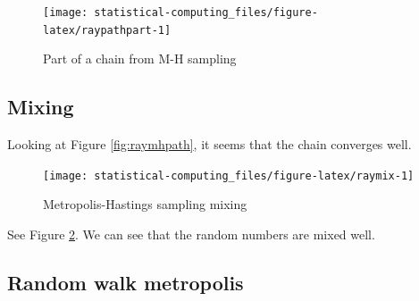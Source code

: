 \documentclass[]{book}
\newenvironment{Shaded}{\begin{snugshade}}{\end{snugshade}}
\newcommand{\DataTypeTok}[1]{\textcolor[rgb]{0.13,0.29,0.53}{#1}}
\newcommand{\KeywordTok}[1]{\textcolor[rgb]{0.13,0.29,0.53}{\textbf{#1}}}
\newcommand{\NormalTok}[1]{#1}
\newcommand{\OperatorTok}[1]{\textcolor[rgb]{0.81,0.36,0.00}{\textbf{#1}}}
\newcommand{\OtherTok}[1]{\textcolor[rgb]{0.56,0.35,0.01}{#1}}
\newcommand{\StringTok}[1]{\textcolor[rgb]{0.31,0.60,0.02}{#1}}
\theoremstyle{definition}
\theoremstyle{definition}
\theoremstyle{definition}
\theoremstyle{remark}
\begin{document}
\begin{figure}[H]

{\centering \texttt{[image: statistical-computing\_files/figure-latex/raypathpart-1]} 

}

\caption{Part of a chain from M-H sampling}\label{fig:raypathpart}
\end{figure}

\hypertarget{mixing}{%
\subsection{Mixing}\label{mixing}}

Looking at Figure \ref{fig:raymhpath}, it seems that the chain converges well.

\begin{Shaded}
\end{Shaded}

\begin{figure}[H]

{\centering \texttt{[image: statistical-computing\_files/figure-latex/raymix-1]} 

}

\caption{Metropolis-Hastings sampling mixing}\label{fig:raymix}
\end{figure}

See Figure \ref{fig:raymix}. We can see that the random numbers are mixed well.

\hypertarget{random-walk-metropolis}{%
\subsection{Random walk metropolis}\label{random-walk-metropolis}}
\end{document}
